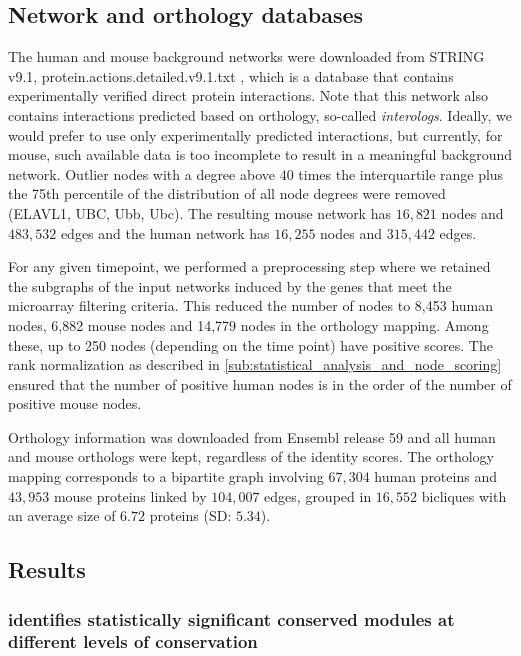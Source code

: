 \subsection{Network and orthology databases}
\label{sub:public_datasets}

The human and mouse background networks were downloaded from STRING v9.1, protein.actions.detailed.v9.1.txt \parencite{franceschini2013string}, which is a database that contains experimentally verified direct protein interactions.
Note that this network also contains interactions predicted based on orthology, so-called \emph{interologs}.
Ideally, we would prefer to use only experimentally predicted interactions, but currently, for mouse, such available data is too incomplete to result in a meaningful background network.
Outlier nodes with a degree above $40$ times the interquartile range plus the 75th percentile of the distribution of all node degrees were removed (ELAVL1, UBC, Ubb, Ubc).
The resulting mouse network has $16,821$ nodes and $483,532$ edges and the human network has $16,255$ nodes and $315,442$ edges.


For any given timepoint, we performed a preprocessing step where we retained the subgraphs of the input networks induced by the genes that meet the microarray filtering criteria.
This reduced the number of nodes to 8,453 human nodes, 6,882 mouse nodes and 14,779 nodes in the orthology mapping.
Among these, up to 250 nodes (depending on the time point) have positive scores.
The rank normalization as described in \cref{sub:statistical_analysis_and_node_scoring} ensured that the number of positive human nodes is in the order of the number of positive mouse nodes.

Orthology information was downloaded from Ensembl release 59 \parencite{flicek2013ensembl} and all human and mouse orthologs were kept, regardless of the identity scores.
The orthology mapping corresponds to a bipartite graph involving $67,304$ human proteins and $43,953$ mouse proteins linked by $104,007$ edges, grouped in $16,552$ bicliques with an average size of $6.72$ proteins (SD: $5.34$).

	\subsection{Results}

		\subsubsection{\xheinz{} identifies statistically significant conserved modules at different levels of conservation}
		\label{sec:xheinz-effic-ident}

